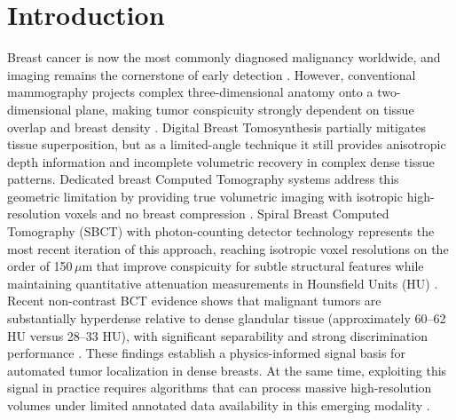 \documentclass{iopjournal}
\begin{document}
\section{Introduction}
Breast cancer is now the most commonly diagnosed malignancy worldwide, and imaging remains the cornerstone of early detection \cite{sung2021global}. However, conventional mammography projects complex three-dimensional anatomy onto a two-dimensional plane, making tumor conspicuity strongly dependent on tissue overlap and breast density \cite{boyd2007mammographic}. Digital Breast Tomosynthesis partially mitigates tissue superposition, but as a limited-angle technique it still provides anisotropic depth information and incomplete volumetric recovery in complex dense tissue patterns. Dedicated breast Computed Tomography systems address this geometric limitation by providing true volumetric imaging with isotropic high-resolution voxels and no breast compression \cite{prionas2010contrast, weber2024potential, berger2020diagnostic}. Spiral Breast Computed Tomography (SBCT) with photon-counting detector technology represents the most recent iteration of this approach, reaching isotropic voxel resolutions on the order of 150\,$\mu$m that improve conspicuity for subtle structural features while maintaining quantitative attenuation measurements in Hounsfield Units (HU) \cite{weber2024potential, wieler2021density, landsmann2022applied}. Recent non-contrast BCT evidence shows that malignant tumors are substantially hyperdense relative to dense glandular tissue (approximately 60--62 HU versus 28--33 HU), with significant separability and strong discrimination performance \cite{weber2024potential}. These findings establish a physics-informed signal basis for automated tumor localization in dense breasts. At the same time, exploiting this signal in practice requires algorithms that can process massive high-resolution volumes under limited annotated data availability in this emerging modality \cite{shim2022fully}.
\end{document}
